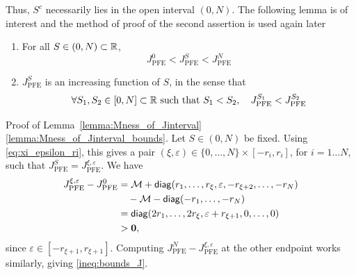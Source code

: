 \documentclass[aspectratio=169]{beamer}
\begin{document}
\begin{frame}
	Thus, $S^c$ necessarily lies in the open interval $(0,N)$.
	The following lemma is of interest and the method of proof of the second assertion is used again later
	\vfill
	\begin{lemma}\label{lemma:Mness_of_Jinterval}
	\begin{enumerate}
		\item \label{lemma:Mness_of_Jinterval_bounds}
		For all $S\in(0,N)\subset\mathbb{R}$,
		\begin{equation}\label{ineq:bounds_J}
		J_{\textrm{PFE}}^{0}< J_{\textrm{PFE}}^{S}<
		J_{\textrm{PFE}}^{N}
		\end{equation}
		\item \label{lemma:Mness_of_Jinterval_increase}
		$J_{\textrm{PFE}}^{S}$ is an increasing function of $S$, in the sense that
	\begin{equation}\label{eq:J_increasing}
	\forall S_1,S_2\in[0,N]\subset\mathbb{R}\textrm{ such that }S_1<S_2,
	\quad
	J_{\textrm{PFE}}^{S_1}< J_{\textrm{PFE}}^{S_2}
	\end{equation}
	\end{enumerate}
	\end{lemma}
\end{frame}


\begin{frame}{Proof of Lemma~\ref{lemma:Mness_of_Jinterval}}
\ref{lemma:Mness_of_Jinterval_bounds}.
	Let $S\in(0,N)$ be fixed.
	Using \eqref{eq:xi_epsilon_ri}, this gives a pair $(\xi,\varepsilon)\in\{0,\ldots,N\}\times[-r_i,r_i]$, for $i=1\ldots N$, such that $J_{\textrm{PFE}}^{S}=J_{\textrm{PFE}}^{\xi,\varepsilon}$.
	We have
	\begin{align*}
	J_{\textrm{PFE}}^{\xi,\varepsilon}-J_{\textrm{PFE}}^{0} 
	&= \M+\diag(r_1,\ldots,r_{\xi},\varepsilon,-r_{\xi+2},\ldots,-r_N) \\
	&\quad -\M-\diag(-r_1,\ldots,-r_N) \\
	&= \diag(2r_1,\ldots,2r_{\xi},\varepsilon+r_{\xi+1},0,\ldots,0) \\
	&>\b0,
	\end{align*}
	since $\varepsilon\in[-r_{\xi+1},r_{\xi+1}]$. 
	Computing $J_{\textrm{PFE}}^{N}-J_{\textrm{PFE}}^{\xi,\varepsilon}$ at the other endpoint works similarly, giving \eqref{ineq:bounds_J}. 
\end{frame}
\end{document}
